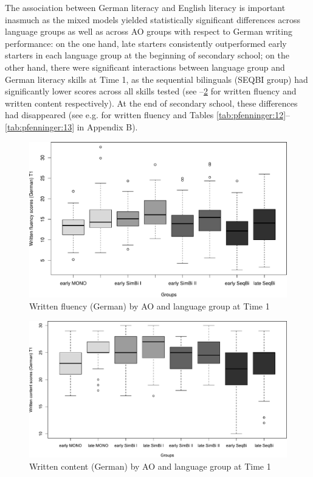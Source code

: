 \documentclass[output=paper,modfonts,nonflat,newtxmath]{langsci/langscibook}
\begin{document}
The association between German literacy and English literacy is important inasmuch as the mixed models yielded statistically significant differences across language groups as well as across AO groups with respect to German writing performance: on the one hand, late starters consistently outperformed early starters in each language group at the beginning of secondary school; on the other hand, there were significant interactions between language group and German literacy skills at Time 1, as the sequential bilinguals (SEQBI group) had significantly lower scores across all skills tested (see --\ref{fig:pfenninger:10} for written fluency and written content respectively). At the end of secondary school, these differences had disappeared (see e.g.  for written fluency and Tables \ref{tab:pfenninger:12}--\ref{tab:pfenninger:13} in Appendix B).%


\begin{figure}%
\includegraphics[height=.45\textheight]{figures/PfenningerFigure9.pdf}
 \caption{\label{fig:pfenninger:9}Written fluency (German) by AO and language group at Time 1}
\end{figure}


\begin{figure}%
\includegraphics[width=\textwidth]{figures/PfenningerFigure10.pdf}
\caption{\label{fig:pfenninger:10} Written content (German) by AO and language group at Time 1}
\end{figure}
\end{document}

